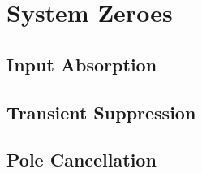 \section*{System Zeroes}
\subsection*{Input Absorption}
\subsection*{Transient Suppression}
\subsection*{Pole Cancellation}
